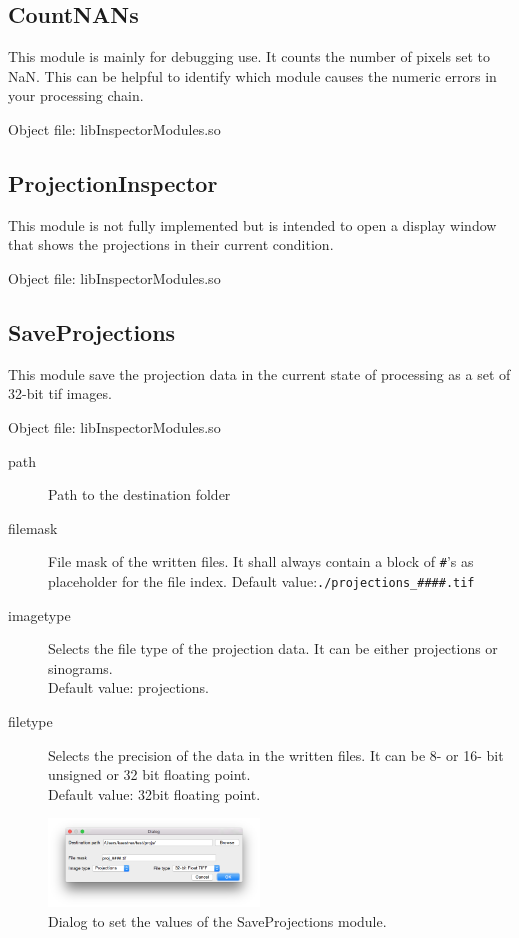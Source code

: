 \documentclass[a4paper]{scrreprt}
\begin{document}
\subsection{CountNANs}
This module is mainly for debugging use. It counts the number of pixels set
to NaN. This can be helpful to identify which module causes the numeric errors
in your processing chain.

Object file: libInspectorModules.so

\subsection{ProjectionInspector}
This module is not fully implemented but is intended to open a display window
that shows the projections in their current condition.

Object file: libInspectorModules.so

\subsection{SaveProjections}
This module save the projection data in the current state of processing as a
set of 32-bit tif images.

Object file: libInspectorModules.so
\begin{description}
\item[path] Path to the destination folder 
\item[filemask] File mask of the written files. It shall always contain a block of \verb+#+'s as placeholder for the file index. Default value:\verb+./projections_####.tif+
\item[imagetype] Selects the file type of the projection data. It can be either
projections or sinograms. \\Default value: projections.
\item[filetype] Selects the precision of the data in the written files. It can be 8- or 16- bit unsigned or 32 bit floating point.\\Default value: 32bit floating point.
\end{description}
\begin{figure}[ht!]
\centering
\includegraphics[width=0.5\textwidth]{figures/SaveProjectionsDlg.png}
\caption{Dialog to set the values of the SaveProjections module.}
\end{figure}
\end{document}
